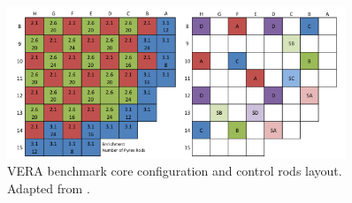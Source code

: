 \begin{figure}
    \centering
    \includegraphics[width=0.9\textwidth]{figs/core.png}
    \caption[VERA benchmark core configuration and control rods layout.]{VERA benchmark core configuration and control rods layout. Adapted from \cite{godfrey}.}
    \label{f1}
\end{figure}


\clearpage

\clearpage
